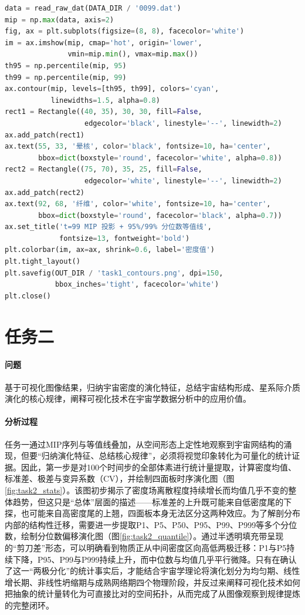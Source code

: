 \documentclass[12pt,a4paper]{article}
\begin{document}
\begin{lstlisting}[language=Python, caption=等值线叠加图生成关键代码]
data = read_raw_dat(DATA_DIR / '0099.dat')
mip = np.max(data, axis=2)
fig, ax = plt.subplots(figsize=(8, 8), facecolor='white')
im = ax.imshow(mip, cmap='hot', origin='lower',
               vmin=mip.min(), vmax=mip.max())
th95 = np.percentile(mip, 95)
th99 = np.percentile(mip, 99)
ax.contour(mip, levels=[th95, th99], colors='cyan',
           linewidths=1.5, alpha=0.8)
rect1 = Rectangle((40, 35), 30, 30, fill=False,
                   edgecolor='black', linestyle='--', linewidth=2)
ax.add_patch(rect1)
ax.text(55, 33, '晕核', color='black', fontsize=10, ha='center',
        bbox=dict(boxstyle='round', facecolor='white', alpha=0.8))
rect2 = Rectangle((75, 70), 35, 25, fill=False,
                   edgecolor='white', linestyle='--', linewidth=2)
ax.add_patch(rect2)
ax.text(92, 68, '纤维', color='white', fontsize=10, ha='center',
        bbox=dict(boxstyle='round', facecolor='black', alpha=0.7))
ax.set_title('t=99 MIP 投影 + 95%/99% 分位数等值线',
             fontsize=13, fontweight='bold')
plt.colorbar(im, ax=ax, shrink=0.6, label='密度值')
plt.tight_layout()
plt.savefig(OUT_DIR / 'task1_contours.png', dpi=150,
            bbox_inches='tight', facecolor='white')
plt.close()
\end{lstlisting}


\section{任务二}

\paragraph{问题}
基于可视化图像结果，归纳宇宙密度的演化特征，总结宇宙结构形成、星系际介质演化的核心规律，阐释可视化技术在宇宙学数据分析中的应用价值。

\paragraph{分析过程}
任务一通过MIP序列与等值线叠加，从空间形态上定性地观察到宇宙网结构的涌现，但要``归纳演化特征、总结核心规律''，必须将视觉印象转化为可量化的统计证据。因此，第一步是对100个时间步的全部体素进行统计量提取，计算密度均值、标准差、极差与变异系数（CV），并绘制四面板时序演化图（图\ref{fig:task2_stats}）。该图初步揭示了密度场离散程度持续增长而均值几乎不变的整体趋势，但这只是``总体''层面的描述——标准差的上升既可能来自低密度尾的下探，也可能来自高密度尾的上翘，四面板本身无法区分这两种效应。为了解剖分布内部的结构性迁移，需要进一步提取P1、P5、P50、P95、P99、P999等多个分位数，绘制分位数偏移演化图（图\ref{fig:task2_quantile}）。通过半透明填充带呈现的``剪刀差''形态，可以明确看到物质正从中间密度区向高低两极迁移：P1与P5持续下降，P95、P99与P999持续上升，而中位数与均值几乎平行微降。只有在确认了这一``两极分化''的统计事实后，才能结合宇宙学理论将演化划分为均匀期、线性增长期、非线性坍缩期与成熟网络期四个物理阶段，并反过来阐释可视化技术如何把抽象的统计量转化为可直接比对的空间拓扑，从而完成了从图像观察到规律提炼的完整闭环。
\end{document}
